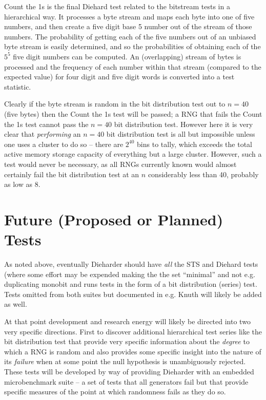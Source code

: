 \documentclass[12pt]{book}
\begin{document}
Count the 1s is the final Diehard test related to the bitstream tests in
a hierarchical way.  It processes a byte stream and maps each byte into
one of five numbers, and then create a five digit base 5 number out of
the stream of those numbers.  The probability of getting each of the
five numbers out of an unbiased byte stream is easily determined, and so
the probabilities of obtaining each of the $5^5$ five digit numbers can
be computed.  An (overlapping) stream of bytes is processed and the
frequency of each number within that stream (compared to the expected
value) for four digit and five digit words is converted into a test
statistic.

Clearly if the byte stream is random in the bit distribution test out to
$n = 40$ (five bytes) then the Count the 1s test will be passed; a RNG
that fails the Count the 1s test cannot pass the $n = 40$ bit
distribution test.  However here it is very clear that {\em performing}
an $n = 40$ bit distribution test is all but impossible unless one uses
a cluster to do so -- there are $2^40$ bins to tally, which exceeds the
total active memory storage capacity of everything but a large cluster.
However, such a test would never be necessary, as all RNGs currently
known would almost certainly fail the bit distribution test at an $n$
considerably less than 40, probably as low as 8.

\section{Future (Proposed or Planned) Tests}

As noted above, eventually Dieharder should have {\em all} the STS and
Diehard tests (where some effort may be expended making the the set
``minimal'' and not e.g. duplicating monobit and runs tests in the form
of a bit distribution (series) test.  Tests omitted from both suites but
documented in e.g. Knuth will likely be added as well.

At that point development and research energy will likely be directed
into two very specific directions.  First to discover additional
hierarchical test series like the bit distribution test that provide
very specific information about the {\em degree} to which a RNG is
random and also provides some specific insight into the nature of its
{\em failure} when at some point the null hypothesis is unambiguously
rejected.  These tests will be developed by way of providing Dieharder
with an embedded microbenchmark suite -- a set of tests that all
generators fail but that provide specific measures of the point at which
randomness fails as they do so.  
\end{document}
